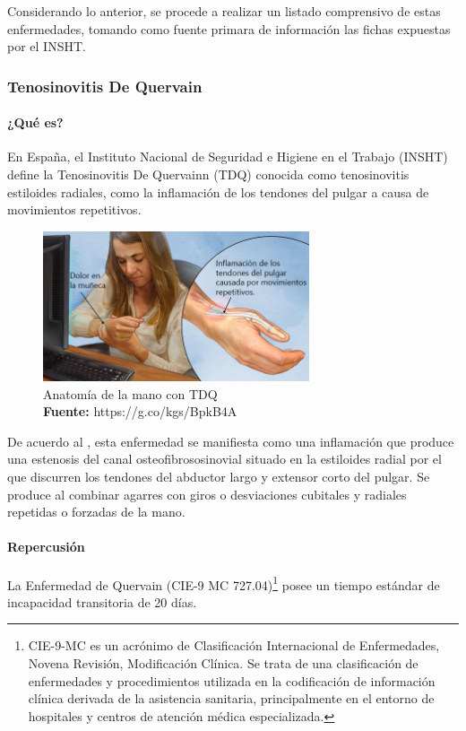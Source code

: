 Considerando lo anterior, se procede a realizar un listado comprensivo de estas enfermedades, tomando como fuente primara de información las fichas expuestas por el INSHT.

\subsubsection{Tenosinovitis De Quervain}
\paragraph{¿Qué es?}
En España, el Instituto Nacional de Seguridad e Higiene en el Trabajo (INSHT) define la Tenosinovitis De Quervainn (TDQ) conocida como tenosinovitis estiloides radiales, como la inflamación de los tendones del pulgar a causa de movimientos repetitivos. \parencite[1]{INSHT2017TendinitisPulgar}

\begin{figure}[H]
    \centering
    \includegraphics[width=0.7\textwidth]{Anexos/LATEX/chapters/images/TDQ.jpg}
    \caption{Anatomía de la mano con TDQ \\\textbf{Fuente:} https://g.co/kgs/BpkB4A}
    \label{TDQ}
\end{figure}

De acuerdo al \parencite[2]{INSHT2017TendinitisPulgar}, esta enfermedad se manifiesta como una inflamación que produce una estenosis del canal osteofibrososinovial situado en la estiloides radial por el que discurren los tendones del abductor largo y extensor corto del pulgar. Se produce al combinar agarres con giros o desviaciones cubitales y radiales repetidas o forzadas de la mano.
\paragraph{Repercusión}
La Enfermedad de Quervain (CIE-9 MC 727.04)\footnote{CIE-9-MC es un acrónimo de Clasificación Internacional de Enfermedades, Novena Revisión, Modificación Clínica. Se trata de una clasificación de enfermedades y procedimientos utilizada en la codificación de información clínica derivada de la asistencia sanitaria, principalmente en el entorno de hospitales y centros de atención médica especializada.} posee un tiempo estándar de incapacidad transitoria de 20 días.\parencite[6]{INSHT2017TendinitisPulgar}
